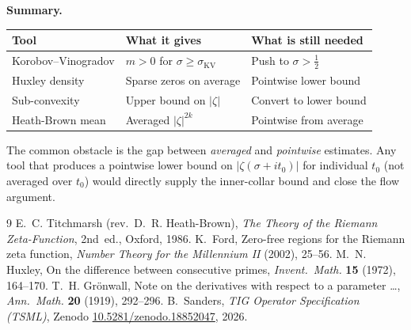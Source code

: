 \documentclass[11pt]{article}
\begin{document}
\medskip\noindent\textbf{Summary.}
\begin{center}
\begin{tabular}{lll}
\hline
Tool & What it gives & What is still needed \\
\hline
Korobov--Vinogradov & $m>0$ for $\sigma\ge\sigma_{\mathrm{KV}}$ & Push to $\sigma>\tfrac12$ \\
Huxley density & Sparse zeros on average & Pointwise lower bound \\
Sub-convexity & Upper bound on $|\zeta|$ & Convert to lower bound \\
Heath-Brown mean & Averaged $|\zeta|^{2k}$ & Pointwise from average \\
\hline
\end{tabular}
\end{center}
The common obstacle is the gap between \emph{averaged} and
\emph{pointwise} estimates.
Any tool that produces a pointwise lower bound on $|\zeta(\sigma+it_0)|$
for individual $t_0$ (not averaged over $t_0$) would directly supply
the inner-collar bound and close the flow argument.

\begin{thebibliography}{9}
  E.~C. Titchmarsh (rev.\ D.~R. Heath-Brown),
  \textit{The Theory of the Riemann Zeta-Function}, 2nd~ed.,
  Oxford, 1986.
  K.~Ford,
  Zero-free regions for the Riemann zeta function,
  \textit{Number Theory for the Millennium II} (2002), 25--56.
  M.~N. Huxley,
  On the difference between consecutive primes,
  \textit{Invent.\ Math.} \textbf{15} (1972), 164--170.
  T.~H. Gr\"onwall,
  Note on the derivatives with respect to a parameter \ldots,
  \textit{Ann.\ Math.} \textbf{20} (1919), 292--296.
  B.~Sanders, \textit{TIG Operator Specification (TSML)},
  Zenodo \href{https://doi.org/10.5281/zenodo.18852047}{10.5281/zenodo.18852047},
  2026.
\end{thebibliography}
\end{document}
